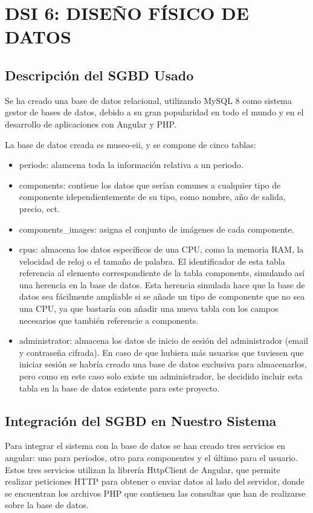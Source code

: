 \newpage
\section{DSI 6: DISEÑO FÍSICO DE DATOS}

\subsection{Descripción del SGBD Usado} 
Se ha creado una base de datos relacional, utilizando MySQL 8 como sistema gestor de bases de datos, debido a su gran popularidad en todo el mundo y en el desarrollo de aplicaciones con Angular y PHP.
\par La base de datos creada es museo-eii, y se compone de cinco tablas: 
\begin{itemize}
	\item periods: alamcena toda la información relativa a un periodo.
	\item components: contiene los datos que serían comunes a cualquier tipo de componente idependientemente de su tipo, como nombre, año de salida, precio, ect.
	\item components\_images: asigna el conjunto de imágenes de cada componente.
	\item cpus: almacena los datos específicos de una CPU, como la memoria RAM, la velocidad de reloj o el tamaño de palabra. El identificador de esta tabla referencia al elemento correspondiente de la tabla components, simulando así una herencia en la base de datos. Esta herencia simulada hace que la base de datos sea fácilmente ampliable si se añade un tipo de componente que no sea una CPU, ya que bastaría con añadir una nueva tabla con los campos necesarios que también referencie a components.
	\item administrator: almacena los datos de inicio de sesión del administrador (email y contraseña cifrada). En caso de que hubiera más usuarios que tuviesen que iniciar sesión se habría creado una base de datos exclusiva para almacenarlos, pero como en este caso solo existe un administrador, he decidido incluir esta tabla en la base de datos existente para este proyecto.
\end{itemize}
\subsection{Integración del SGBD en Nuestro Sistema} 
Para integrar el sistema con la base de datos se han creado tres servicios en angular: uno para periodos, otro para componentes y el último para el usuario. Estos tres servicios utilizan la librería HttpClient de Angular, que permite realizar peticiones HTTP para obtener o enviar datos al lado del servidor, donde se encuentran los archivos PHP que contienen las consultas que han de realizarse sobre la base de datos.

